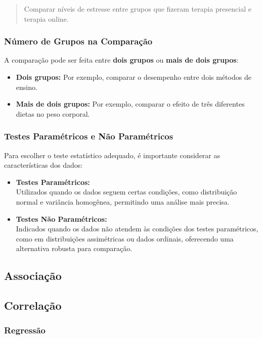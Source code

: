 \documentclass[
]{book}
\providecommand{\tightlist}{%
  \setlength{\itemsep}{0pt}\setlength{\parskip}{0pt}}
\begin{document}
\begin{quote}
Comparar níveis de estresse entre grupos que fizeram terapia presencial e terapia online.
\end{quote}

\subsubsection{Número de Grupos na Comparação}\label{nuxfamero-de-grupos-na-comparauxe7uxe3o}

A comparação pode ser feita entre \textbf{dois grupos} ou \textbf{mais de dois grupos}:

\begin{itemize}
\tightlist
\item
  \textbf{Dois grupos:} Por exemplo, comparar o desempenho entre dois métodos de ensino.
\item
  \textbf{Mais de dois grupos:} Por exemplo, comparar o efeito de três diferentes dietas no peso corporal.
\end{itemize}

\subsubsection{Testes Paramétricos e Não Paramétricos}\label{testes-paramuxe9tricos-e-nuxe3o-paramuxe9tricos}

Para escolher o teste estatístico adequado, é importante considerar as características dos dados:

\begin{itemize}
\item
  \textbf{Testes Paramétricos:}\\
  Utilizados quando os dados seguem certas condições, como distribuição normal e variância homogênea, permitindo uma análise mais precisa.
\item
  \textbf{Testes Não Paramétricos:}\\
  Indicados quando os dados não atendem às condições dos testes paramétricos, como em distribuições assimétricas ou dados ordinais, oferecendo uma alternativa robusta para comparação.
\end{itemize}

\subsection{Associação}\label{associauxe7uxe3o}

\subsection{Correlação}\label{correlauxe7uxe3o}

\subsubsection{Regressão}\label{regressuxe3o}

  
\end{document}
